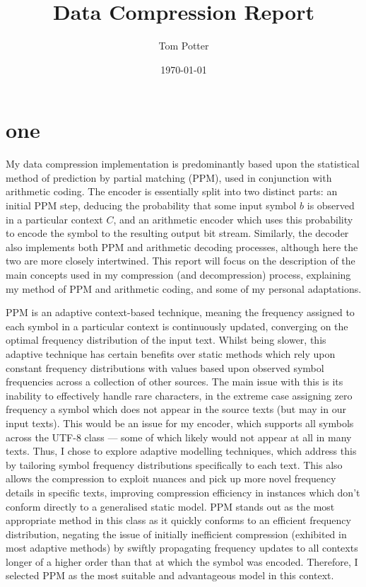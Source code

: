 \documentclass[a4paper, 11pt]{article}
\title{Data Compression Report}
\author{Tom Potter}
\date{\today}
\begin{document}
\maketitle
\section{one}

My data compression implementation is predominantly based upon the statistical method of prediction by partial matching (PPM), used in conjunction with arithmetic coding. The encoder is essentially split into two distinct parts: an initial PPM step, deducing the probability that some input symbol $b$ is observed in a particular context $C$, and an arithmetic encoder which uses this probability to encode the symbol to the resulting output bit stream. Similarly, the decoder also implements both PPM and arithmetic decoding processes, although here the two are more closely intertwined. This report will focus on the description of the main concepts used in my compression (and decompression) process, explaining my method of PPM and arithmetic coding, and some of my personal adaptations.

PPM is an adaptive context-based technique, meaning the frequency assigned to each symbol in a particular context is continuously updated, converging on the optimal frequency distribution of the input text. Whilst being slower, this adaptive technique has certain benefits over static methods which rely upon constant frequency distributions with values based upon observed symbol frequencies across a collection of other sources. The main issue with this is its inability to effectively handle rare characters, in the extreme case assigning zero frequency a symbol which does not appear in the source texts (but may in our input texts). This would be an issue for my encoder, which supports all symbols across the UTF-8 class --- some of which likely would not appear at all in many texts. Thus, I chose to explore adaptive modelling techniques, which address this by tailoring symbol frequency distributions specifically to each text. This also allows the compression to exploit nuances and pick up more novel frequency details in specific texts, improving  compression efficiency in instances which don't conform directly to a generalised static model. PPM stands out as the most appropriate method in this class as it quickly conforms to an efficient frequency distribution, negating the issue of initially inefficient compression (exhibited in most adaptive methods) by swiftly propagating frequency updates to all contexts longer of a higher order than that at which the symbol was encoded. Therefore, I selected PPM as the most suitable and advantageous model in this context.
\end{document}
